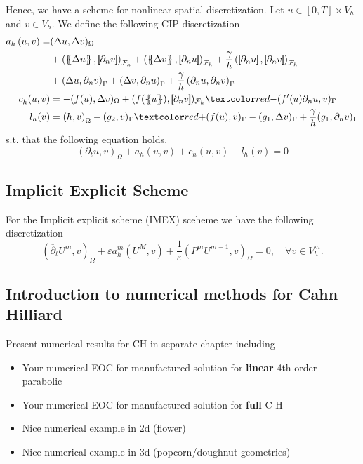 Hence, we have a scheme for nonlinear spatial discretization. Let $u \in \left[ 0,T \right] \times V_{h}  $ and $v \in V_{h}$. We define the following CIP discretization
\begin{equation}
    \label{eq:cip_ch}
    \begin{split}
        a_{h} \left( u, v \right)   =& ( \Delta  u, \Delta v ) _{ \Omega } \\
                                     & + \left( \mean{  \Delta  u }, \jump{ \partial _{n }v} \right)_{\mathcal{F}_{h}  }  + \left( \mean{ \Delta  v }, \jump{ \partial _{n}u }      \right)_{\mathcal{F}_{h}  }  + \frac{\gamma }{h}  \left( \jump{ \partial _{n} u}, \jump{ \partial _{n} v   }   \right)_{\mathcal{F}_{h} } \\
                                     & + \left(   \Delta  u ,  \partial _{n }v \right)_{\Gamma   }  + \left(  \Delta  v ,  \partial _{n}u       \right)_{\Gamma  }  + \frac{\gamma }{h}  \left(  \partial _{n} u,  \partial _{n} v      \right)_{ \Gamma } \\
    c^{}_{h} ( u,v) & = - ( f( u), \Delta v )_{ \Omega } + ( f( \mean{ u }  ), \jump{ \partial _{n} v }   )_{\mathcal{F}_{h} }  \red{- ( f' (  u  )  \partial _{n}u ,  v      )_{ \Gamma }} \\
    l_{h}( v_{}) & =  \left( h, v \right) _{\Omega } - ( g_{2},  v )_{\Gamma } \red{+(f(u),  v )_{\Gamma }} -  ( g_{1}, \Delta  v  )_{\Gamma }  + \frac{\gamma }{h} ( g_{1}, \partial _{n} v  )_{\Gamma }
    \end{split}
\end{equation}
s.t. that the following equation holds.
\[
    ( \partial _{t}u, v)_\Omega + a_{h}( u,v) + c_{h}( u,v) - l_{h}(v)  = 0
\]


\subsection{Implicit Explicit Scheme}%
\label{sub:implicit_explicit_scheme}


For the Implicit explicit scheme (IMEX) sceheme we have the following discretization
\[
( \overline{\partial } _{t} U^{m}, v   )_{\Omega } + \varepsilon a^{m}_{h}( U^{M} , v) + \frac{1}{\varepsilon } ( P^{m} U^{m-1}, v) _{\Omega } =0, \quad \forall v \in V_{h}^{m}.
\]


\subsection{Introduction to numerical methods for Cahn Hilliard}%
\label{sub:introduction_to_numerical_methods_for_cahn_hilliard}

Present numerical results for CH in separate chapter including
\begin{itemize}
    \item Your numerical EOC for  manufactured solution for \textbf{linear} 4th order parabolic
    \item Your numerical EOC for  manufactured solution for \textbf{full} C-H
    \item Nice numerical example in 2d (flower)
    \item Nice numerical example in 3d (popcorn/doughnut geometries)
\end{itemize}



